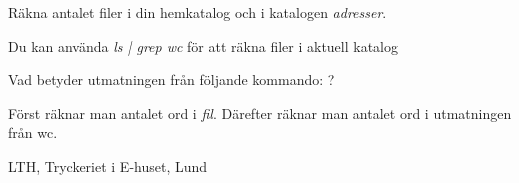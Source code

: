 \documentclass[a4paper,twocolumn]{book}
\begin{document}
\begin{exercise}
  Räkna antalet filer i din hemkatalog och i katalogen \emph{adresser}.
  \begin{answer}
    Du kan använda \emph{ls | grep wc} för att räkna filer i aktuell katalog
  \end{answer}
\end{exercise}
\begin{exercise}
  Vad betyder utmatningen från följande kommando:
  \mbox{}?
  \begin{answer}
    Först räknar man antalet ord i \emph{fil}. Därefter räknar man
    antalet ord i utmatningen från wc.
  \end{answer}
\end{exercise}



\appendix
\answers
\label{answers}

\onecolumn
\printindex

\cleardoublepage
\thispagestyle{empty}
\hbox{}
\newpage
\onecolumn
\thispagestyle{empty}
\hbox{}\vfill\noindent\small
\centerline{LTH, Tryckeriet i E-huset, Lund \number\year{}}
\end{document}
